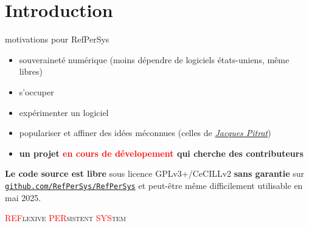 \documentclass[final,a4,xcolor={svgnames,dvipsnames}]{beamer}
\begin{document}
 \section{Introduction}
 \label{sec:intro}
 
 \begin{frame}{motivations pour RefPerSys}

   \begin{itemize}
   \item souveraineté numérique \small{(moins dépendre de logiciels
     états-uniens, même libres)}
   \item s'occuper 
   \item expérimenter un logiciel
   \item populariser et affiner des idées méconnues (celles de
     \href{https://fr.wikipedia.org/wiki/Jacques_Pitrat}{\it Jacques
       Pitrat})
   \item \textbf{un projet \textcolor{red}{en cours de dévelopement} qui cherche des contributeurs}
   \end{itemize}

   \bigskip
   \textbf{Le code source est libre} sous licence GPLv3+/CeCILLv2
   \textbf{sans garantie} sur
   \href{https://github.com/RefPerSys/RefPerSys}{\texttt{github.com/RefPerSys/RefPerSys}}
   et peut-être même difficilement utilisable en mai 2025.

   \bigskip

   \begin{center}
     \large\textsc{\textcolor{red}{REF}lexive \textcolor{red}{PER}sistent \textcolor{red}{SYS}tem}
   \end{center}
 \end{frame}
 
\end{document}
